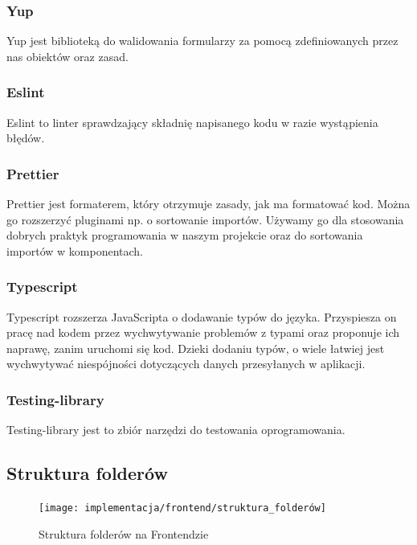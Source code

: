 \documentclass[a4paper,11pt]{report}
\begin{document}
\subsubsection{Yup}
Yup\cite{yup} jest biblioteką do walidowania formularzy za pomocą zdefiniowanych przez nas obiektów oraz zasad.

\subsubsection{Eslint}
Eslint\cite{eslint} to linter sprawdzający składnię napisanego kodu w razie wystąpienia błędów.\\  

\subsubsection{Prettier}
Prettier\cite{prettier} jest formaterem, który otrzymuje zasady, jak ma formatować kod.
 Można go rozszerzyć pluginami np. o sortowanie importów.
 Używamy go dla stosowania dobrych praktyk programowania w naszym projekcie oraz do sortowania importów w komponentach.\\

\subsubsection{Typescript}
Typescript\cite{typescript} rozszerza JavaScripta o dodawanie typów do języka. 
Przyspiesza on pracę nad kodem przez wychwytywanie problemów z typami oraz proponuje ich naprawę, zanim uruchomi się kod.
Dzieki dodaniu typów, o wiele łatwiej jest wychwytywać niespójności dotyczących danych przesyłanych w aplikacji.\\

\subsubsection{Testing-library}
Testing-library\cite{testing-library} jest to zbiór narzędzi do testowania oprogramowania.\\

\subsection{Struktura folderów}
\begin{figure}[H]
	\centering
	\texttt{[image: implementacja/frontend/struktura\_folderów]}\\
	\caption{Struktura folderów na Frontendzie}
	\label{fig:struktura_folderów_front}
\end{figure}
\end{document}
